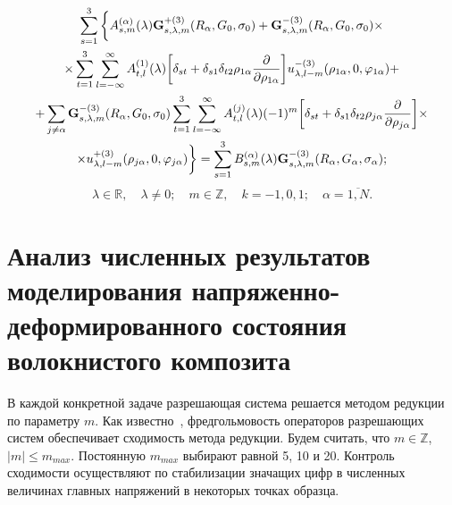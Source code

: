 \begin{multline}
\sum\limits_{s = 1}^3 \bigg\{  A_{s,m}^{(\alpha )}(\lambda ){\bf{G}}_{s,\lambda ,m}^{ + (3)}({R_\alpha },{G_0},{\sigma _0}) + {\bf{G}}_{s,\lambda ,m}^{ - (3)}({R_\alpha },{G_0},{\sigma _0}) \times \\
\times \sum\limits_{t = 1}^3 {\sum\limits_{l =  - \infty }^\infty  {A_{t,l}^{(1)}} } (\lambda )\bigg[{\delta _{st}} + {\delta _{s1}}{\delta _{t2}}{\rho _{1\alpha }}\frac{\partial }{{\partial {\rho _{1\alpha }}}}\bigg]u_{\lambda ,l - m}^{ - (3)}({\rho _{1\alpha }},0,{\varphi _{1\alpha }}) + \\
+ \sum\limits_{j \ne \alpha } {{\bf{G}}_{s,\lambda ,m}^{ - (3)}} ({R_\alpha },{G_0},{\sigma _0})\sum\limits_{t = 1}^3 {\sum\limits_{l =  - \infty }^\infty  {A_{t,l}^{(j)}} } (\lambda ){( - 1)^m}\bigg[{\delta _{st}} + {\delta _{s1}}{\delta _{t2}}{\rho _{j\alpha }}\frac{\partial }{{\partial {\rho _{j\alpha }}}}\bigg] \times \\
\times u_{\lambda ,l - m}^{ + (3)}({\rho _{j\alpha }},0,{\varphi _{j\alpha }})\bigg\}  = \sum\limits_{s = 1}^3 {B_{s,m}^{(\alpha )}} (\lambda ){\bf{G}}_{s,\lambda ,m}^{ - (3)}({R_\alpha },{G_\alpha },{\sigma _\alpha });
\end{multline}
$$
\lambda\in\mathbb{R},\quad\lambda\neq 0;\quad m\in\mathbb{Z},\quad k=-1,0,1;\quad\alpha  = \overline {1,N}.
$$

\section{Анализ численных результатов моделирования на\-пря\-же\-н\-но-де\-фор\-ми\-ро\-ва\-н\-но\-го состояния волокнистого композита}

В каждой конкретной задаче разрешающая система решается методом редукции по параметру $m$. Как известно~\cite{Kantorovich}, фредгольмовость операторов разрешающих систем обеспечивает сходимость метода редукции. Будем считать, что $m\in\mathbb{Z}$, $|m|\le m_{max}$. Постоянную $m_{max}$ выбирают равной 5, 10 и 20. Контроль сходимости осуществляют по стабилизации значащих цифр в численных величинах главных напряжений в некоторых точках образца.

